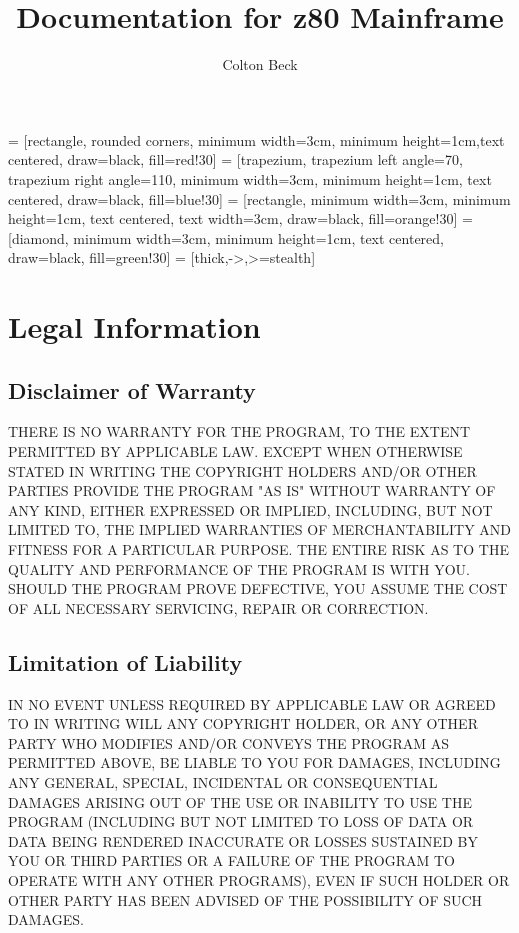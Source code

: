 \documentclass{book}
\begin{document}
 = [rectangle, rounded corners, minimum width=3cm, minimum height=1cm,text centered, draw=black, fill=red!30]
 = [trapezium, trapezium left angle=70, trapezium right angle=110, minimum width=3cm, minimum height=1cm, text centered, draw=black, fill=blue!30]
 = [rectangle, minimum width=3cm, minimum height=1cm, text centered, text width=3cm, draw=black, fill=orange!30]
 = [diamond, minimum width=3cm, minimum height=1cm, text centered, draw=black, fill=green!30]
 = [thick,->,>=stealth]

\frontmatter
\title{Documentation for z80 Mainframe}
\author{Colton Beck}
\maketitle
\section*{Legal Information}
\subsection*{Disclaimer of Warranty}

  THERE IS NO WARRANTY FOR THE PROGRAM, TO THE EXTENT PERMITTED BY
APPLICABLE LAW.  EXCEPT WHEN OTHERWISE STATED IN WRITING THE COPYRIGHT
HOLDERS AND/OR OTHER PARTIES PROVIDE THE PROGRAM "AS IS" WITHOUT WARRANTY
OF ANY KIND, EITHER EXPRESSED OR IMPLIED, INCLUDING, BUT NOT LIMITED TO,
THE IMPLIED WARRANTIES OF MERCHANTABILITY AND FITNESS FOR A PARTICULAR
PURPOSE.  THE ENTIRE RISK AS TO THE QUALITY AND PERFORMANCE OF THE PROGRAM
IS WITH YOU.  SHOULD THE PROGRAM PROVE DEFECTIVE, YOU ASSUME THE COST OF
ALL NECESSARY SERVICING, REPAIR OR CORRECTION.

\subsection*{Limitation of Liability}

  IN NO EVENT UNLESS REQUIRED BY APPLICABLE LAW OR AGREED TO IN WRITING
WILL ANY COPYRIGHT HOLDER, OR ANY OTHER PARTY WHO MODIFIES AND/OR CONVEYS
THE PROGRAM AS PERMITTED ABOVE, BE LIABLE TO YOU FOR DAMAGES, INCLUDING ANY
GENERAL, SPECIAL, INCIDENTAL OR CONSEQUENTIAL DAMAGES ARISING OUT OF THE
USE OR INABILITY TO USE THE PROGRAM (INCLUDING BUT NOT LIMITED TO LOSS OF
DATA OR DATA BEING RENDERED INACCURATE OR LOSSES SUSTAINED BY YOU OR THIRD
PARTIES OR A FAILURE OF THE PROGRAM TO OPERATE WITH ANY OTHER PROGRAMS),
EVEN IF SUCH HOLDER OR OTHER PARTY HAS BEEN ADVISED OF THE POSSIBILITY OF
SUCH DAMAGES.
\end{document}
